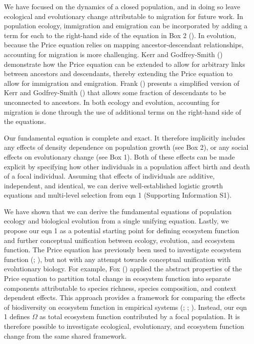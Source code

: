 \documentclass[
]{article}
\begin{document}
We have focused on the dynamics of a closed population, and in doing so
leave ecological and evolutionary change attributable to migration for
future work. In population ecology, immigration and emigration can be
incorporated by adding a term for each to the right-hand side of the
equation in Box 2 (). In
evolution, because the Price equation relies on mapping
ancestor-descendant relationships, accounting for migration is more
challenging. Kerr and Godfrey-Smith ()
demonstrate how the Price equation can be extended to allow for
arbitrary links between ancestors and descendants, thereby extending the
Price equation to allow for immigration and emigration. Frank
() presents a simplified version of Kerr
and Godfrey-Smith () that allows some
fraction of descendants to be unconnected to ancestors. In both ecology
and evolution, accounting for migration is done through the use of
additional terms on the right-hand side of the equations.

Our fundamental equation is complete and exact. It therefore implicitly
includes any effects of density dependence on population growth (see Box
2), or any social effects on evolutionary change (see Box 1). Both of
these effects can be made explicit by specifying how other individuals
in a population affect birth and death of a focal individual. Assuming
that effects of individuals are additive, independent, and identical, we
can derive well-established logistic growth equations and multi-level
selection from eqn 1 (Supporting Information S1).

We have shown that we can derive the fundamental equations of population
ecology and biological evolution from a single unifying equation.
Lastly, we propose our eqn 1 as a potential starting point for defining
ecosystem function and further conceptual unification between ecology,
evolution, and ecosystem function. The Price equation has previously
been used to investigate ecosystem function
(;
), but not with any attempt towards
conceptual unification with evolutionary biology. For example, Fox
() applied the abstract properties of the
Price equation to partition total change in ecosystem function into
separate components attributable to species richness, species
composition, and context dependent effects. This approach provides a
framework for comparing the effects of biodiversity on ecosystem
function in empirical systems (;
;
). Instead, our
eqn 1 defines \(\Omega\) as total ecosystem function contributed by a
focal population. It is therefore possible to investigate ecological,
evolutionary, and ecosystem function change from the same shared
framework.
\end{document}
